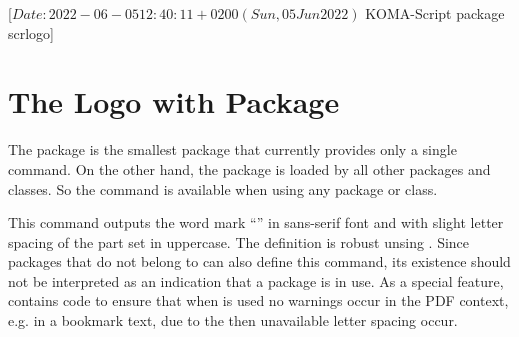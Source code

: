 %
%
%
%
%
%
%

                 [$Date: 2022-06-05 12:40:11 +0200 (Sun, 05 Jun 2022) $
                  KOMA-Script package scrlogo]


\chapter{The \KOMAScript{} Logo with Package }
\BeginIndexGroup
{}%

The  package is the smallest \KOMAScript{} package that
currently provides only a single command. On the other hand, the package
is loaded by all other \KOMAScript{} packages and \KOMAScript{} classes. So
the command is available when using any \KOMAScript{} package or
\KOMAScript{} class.

\begin{Declaration}
\end{Declaration}
This command outputs the word mark ``\KOMAScript'' in sans-serif font and with
slight letter spacing of the part set in uppercase. The definition is robust
unsing . Since packages that do not belong to
\KOMAScript{} can also define this command, its existence should not be
interpreted as an indication that a \KOMAScript{} package is in use. As a
special feature, 
contains code to ensure that when
 is
used no warnings occur in the PDF context, e.g. in a bookmark text, due to
the then unavailable letter spacing occur.%
\EndIndexGroup
\EndIndexGroup
\endinput
                  

